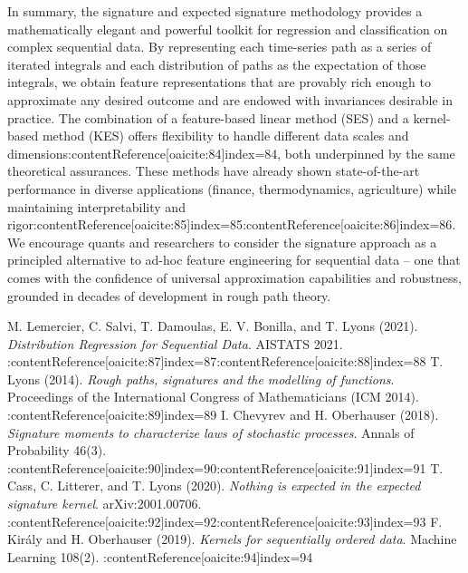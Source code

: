 \documentclass[11pt]{article}
\begin{document}
In summary, the signature and expected signature methodology provides a mathematically elegant and powerful toolkit for regression and classification on complex sequential data. By representing each time-series path as a series of iterated integrals and each distribution of paths as the expectation of those integrals, we obtain feature representations that are provably rich enough to approximate any desired outcome and are endowed with invariances desirable in practice. The combination of a feature-based linear method (SES) and a kernel-based method (KES) offers flexibility to handle different data scales and dimensions:contentReference[oaicite:84]{index=84}, both underpinned by the same theoretical assurances. These methods have already shown state-of-the-art performance in diverse applications (finance, thermodynamics, agriculture) while maintaining interpretability and rigor:contentReference[oaicite:85]{index=85}:contentReference[oaicite:86]{index=86}. We encourage quants and researchers to consider the signature approach as a principled alternative to ad-hoc feature engineering for sequential data – one that comes with the confidence of universal approximation capabilities and robustness, grounded in decades of development in rough path theory.


\begin{thebibliography}{9}\setlength{\itemsep}{-1mm}
 M. Lemercier, C. Salvi, T. Damoulas, E. V. Bonilla, and T. Lyons (2021). \textit{Distribution Regression for Sequential Data}. AISTATS 2021.  :contentReference[oaicite:87]{index=87}:contentReference[oaicite:88]{index=88}
 T. Lyons (2014). \textit{Rough paths, signatures and the modelling of functions}. Proceedings of the International Congress of Mathematicians (ICM 2014). :contentReference[oaicite:89]{index=89}
 I. Chevyrev and H. Oberhauser (2018). \textit{Signature moments to characterize laws of stochastic processes}. Annals of Probability 46(3). :contentReference[oaicite:90]{index=90}:contentReference[oaicite:91]{index=91}
 T. Cass, C. Litterer, and T. Lyons (2020). \textit{Nothing is expected in the expected signature kernel}. arXiv:2001.00706. :contentReference[oaicite:92]{index=92}:contentReference[oaicite:93]{index=93}
 F. Király and H. Oberhauser (2019). \textit{Kernels for sequentially ordered data}. Machine Learning 108(2). :contentReference[oaicite:94]{index=94}
\end{thebibliography}
\end{document}
